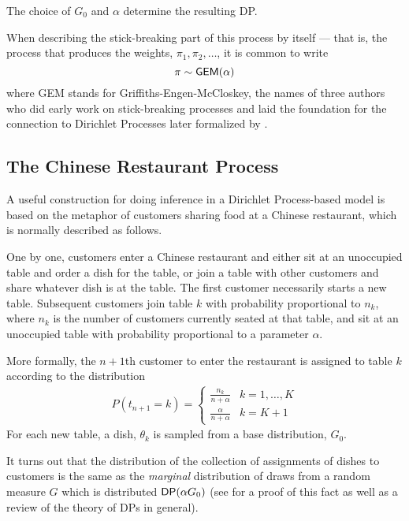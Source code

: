   The choice of $G_0$ and $\alpha$ determine the resulting DP.

  When describing the stick-breaking part of this process by itself
  --- that is, the process that produces the weights, $\pi_1, \pi_2,
  \dots$, it is common to write
  \begin{equation}
    \label{eq:11}
    \pi \sim \mathsf{GEM}(\alpha)
  \end{equation}
  where GEM stands for Griffiths-Engen-McCloskey, the names of three
  authors who did early work on stick-breaking processes and laid the foundation
  for the connection to Dirichlet Processes later formalized by
  \citet{sethuraman1994constructive}.
  
  \subsection{The Chinese Restaurant Process}
  \label{sec:chin-rest-proc}

  A useful construction for doing inference in a Dirichlet
  Process-based model is based on the metaphor of customers sharing
  food at a Chinese restaurant, which is normally described as
  follows.

  One by one, customers enter a Chinese restaurant and either sit at
  an unoccupied table and order a dish for the table, or join a table
  with other customers and share whatever dish is at the table.  The first
  customer necessarily starts a new table.  Subsequent customers join
  table $k$ with probability proportional to $n_k$, where $n_k$ is the
  number of customers currently seated at that table, and sit at an
  unoccupied table with probability proportional to a parameter
  $\alpha$.  

  More formally, the $n+1$th customer to enter the restaurant
  is assigned to table $k$ according to the distribution
  \begin{align}
    P(t_{n+1} = k) =
    \begin{cases}
      \frac{n_k}{n + \alpha} & k = 1, \dots, K \\
      \frac{\alpha}{n + \alpha} & k = K + 1
    \end{cases}
  \end{align}
  For each new table, a dish, $\theta_k$ is sampled from a base
  distribution, $G_0$.

  It turns out that the distribution of the collection of 
  assignments of dishes to customers is the same as the {\em marginal}
  distribution of draws from a random measure $G$ which is distributed
  $\mathsf{DP}(\alpha G_0)$ (see \citet{teh2011dirichlet} for a proof of this
  fact as well as a review of the theory of DPs in general).

